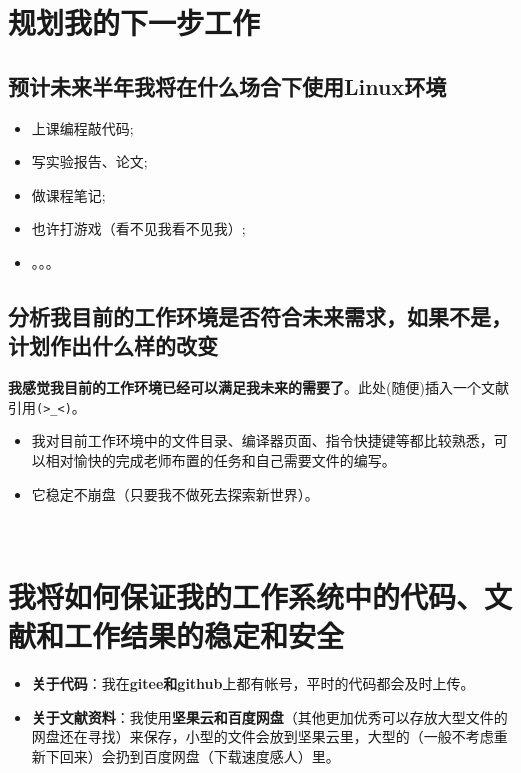 \documentclass{ctexart}
\begin{document}
\section{规划我的下一步工作}

\subsection{预计未来半年我将在什么场合下使用Linux环境}

\begin{itemize}
\item 上课编程敲代码;
\item 写实验报告、论文;
\item 做课程笔记;
\item 也许打游戏（看不见我看不见我）;
\item 。。。
\end{itemize}

\subsection{分析我目前的工作环境是否符合未来需求，如果不是，计划作出什么样的改变}

{\bf 我感觉我目前的工作环境已经可以满足我未来的需要了}\cite{PMSAJoP2018}。此处(随便)插入一个文献引用\verb|(>_<)|。

\begin{itemize}
\item 我对目前工作环境中的文件目录、编译器页面、指令快捷键等都比较熟悉，可以相对愉快的完成老师布置的任务和自己需要文件的编写。
\item 它稳定不崩盘（只要我不做死去探索新世界）。
\end{itemize}
~\\


\section{我将如何保证我的工作系统中的代码、文献和工作结果的稳定和安全}
\begin{itemize}
\item {\bf 关于代码}：我在{\bf gitee和github}上都有帐号，平时的代码都会及时上传。
\item {\bf 关于文献资料}：我使用{\bf 坚果云和百度网盘}（其他更加优秀可以存放大型文件的网盘还在寻找）来保存，小型的文件会放到坚果云里，大型的（一般不考虑重新下回来）会扔到百度网盘（下载速度感人）里。
\end{itemize}


\newpage


\end{document}
